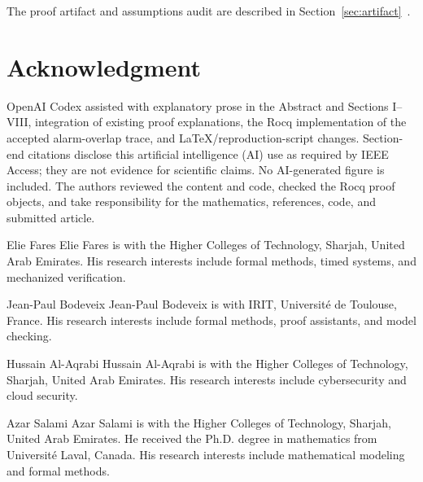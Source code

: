\documentclass{ieeeaccess}
\begin{document}
The proof artifact and assumptions audit are described in
Section~\ref{sec:artifact}~\cite{openai_codex}.

\section*{Acknowledgment}
OpenAI Codex assisted with explanatory prose in the Abstract and Sections
I--VIII, integration of existing proof explanations, the Rocq implementation
of the accepted alarm-overlap trace, and LaTeX/reproduction-script changes.
Section-end citations disclose this artificial intelligence (AI) use as
required by IEEE Access; they are not evidence for scientific claims. No
AI-generated figure is included. The authors reviewed the content and code,
checked the Rocq proof objects, and take responsibility for the mathematics,
references, code, and submitted article.



\begin{IEEEbiographynophoto}{Elie Fares}
Elie Fares is with the Higher Colleges of Technology, Sharjah, United Arab
Emirates. His research interests include formal methods, timed systems, and
mechanized verification.
\end{IEEEbiographynophoto}

\begin{IEEEbiographynophoto}{Jean-Paul Bodeveix}
Jean-Paul Bodeveix is with IRIT, Universit\'e de Toulouse, France. His
research interests include formal methods, proof assistants, and model
checking.
\end{IEEEbiographynophoto}

\begin{IEEEbiographynophoto}{Hussain Al-Aqrabi}
Hussain Al-Aqrabi is with the Higher Colleges of Technology, Sharjah, United
Arab Emirates. His research interests include cybersecurity and cloud
security.
\end{IEEEbiographynophoto}

\begin{IEEEbiographynophoto}{Azar Salami}
Azar Salami is with the Higher Colleges of Technology, Sharjah, United Arab
Emirates. He received the Ph.D. degree in mathematics from Universit\'e Laval,
Canada. His research interests include mathematical modeling and formal
methods.\EOD
\end{IEEEbiographynophoto}
\end{document}
